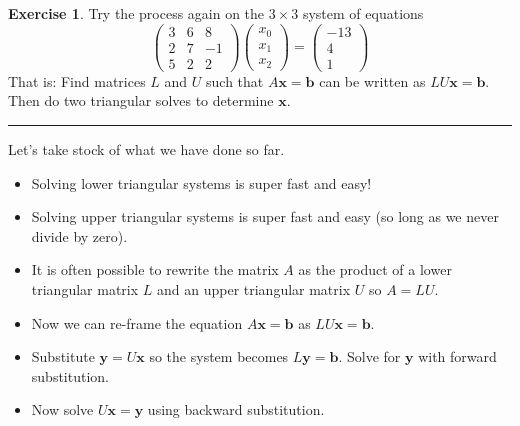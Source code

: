 \documentclass[
]{book}
\providecommand{\tightlist}{%
  \setlength{\itemsep}{0pt}\setlength{\parskip}{0pt}}
\theoremstyle{definition}
\theoremstyle{definition}
\theoremstyle{definition}
\newtheorem{exercise}{Exercise}[chapter]
\theoremstyle{remark}
\begin{document}
\begin{exercise}
\protect\hypertarget{exr:unnamed-chunk-334}{}{\label{exr:unnamed-chunk-334} }Try the process again on the \(3\times 3\) system of equations
\[\begin{pmatrix}
        3 & 6 & 8\\
        2 & 7 & -1 \\
        5 & 2 & 2 
    \end{pmatrix} \begin{pmatrix} x_0 \\ x_1 \\ x_2 \end{pmatrix} = 
        \begin{pmatrix} -13 \\ 4 \\ 1 \end{pmatrix}\] That is: Find
matrices \(L\) and \(U\) such that \(A \boldsymbol{x} = \boldsymbol{b}\) can be written as \(LU\boldsymbol{x} =  \boldsymbol{b}\). Then do two triangular solves to determine \(\boldsymbol{x}\).
\end{exercise}

\begin{center}\rule{0.5\linewidth}{0.5pt}\end{center}

Let's take stock of what we have done so far.

\begin{itemize}
\tightlist
\item
  Solving lower triangular systems is super fast and easy!
\item
  Solving upper triangular systems is super fast and easy (so long as we never divide by zero).\\
\item
  It is often possible to rewrite the matrix \(A\) as the product of a lower triangular matrix \(L\) and an upper triangular matrix \(U\) so \(A=LU\).
\item
  Now we can re-frame the equation \(A \boldsymbol{x} = \boldsymbol{b}\) as \(LU \boldsymbol{x} = \boldsymbol{b}\).\\
\item
  Substitute \(\boldsymbol{y} = U \boldsymbol{x}\) so the system becomes \(L \boldsymbol{y} = \boldsymbol{b}\). Solve for \(\boldsymbol{y}\) with forward substitution.
\item
  Now solve \(U \boldsymbol{x} = \boldsymbol{y}\) using backward substitution.
\end{itemize}
\end{document}
